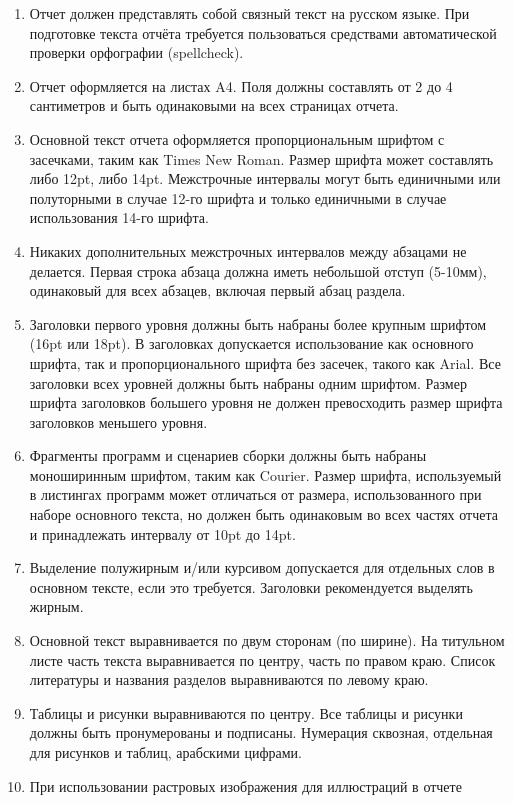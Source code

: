\documentclass[a4paper,12pt,titlepage,final]{article}
\begin{document}
\begin{enumerate}
    \item Отчет должен представлять собой связный текст на русском языке. При
	подготовке текста отчёта требуется пользоваться средствами
	автоматической проверки орфографии (spellcheck).
    \item Отчет оформляется на листах A4. Поля должны составлять от 2 до 4
	сантиметров и быть одинаковыми на всех страницах отчета.
    \item Основной текст отчета оформляется пропорциональным шрифтом с
	засечками, таким как Times New Roman. Размер шрифта может составлять
	либо 12pt, либо 14pt.  Межстрочные интервалы могут быть единичными или
	полуторными в случае 12-го шрифта и только единичными в случае
	использования 14-го шрифта.
    \item Никаких дополнительных межстрочных интервалов между абзацами не
	делается.  Первая строка абзаца должна иметь небольшой отступ (5-10мм),
	одинаковый для всех абзацев, включая первый абзац раздела.
    \item Заголовки первого уровня должны быть набраны более крупным шрифтом
	(16pt или 18pt).  В заголовках допускается использование как основного
	шрифта, так и пропорционального шрифта без засечек, такого как Arial.
	Все заголовки всех уровней должны быть набраны одним шрифтом. Размер
	шрифта заголовков большего уровня не должен превосходить размер шрифта
	заголовков меньшего уровня.
    \item Фрагменты программ и сценариев сборки должны быть набраны моноширинным
	шрифтом, таким как Courier. Размер шрифта, используемый в листингах
	программ может отличаться от размера, использованного при наборе
	основного текста, но должен быть одинаковым во всех частях отчета и
	принадлежать интервалу от 10pt до 14pt.
    \item Выделение полужирным и/или курсивом допускается для отдельных слов в
	основном тексте, если это требуется. Заголовки рекомендуется выделять
	жирным.
    \item Основной текст выравнивается по двум сторонам (по ширине). На
	титульном листе часть текста выравнивается по центру, часть по правом
	краю. Список литературы и названия разделов выравниваются по левому
	краю.
    \item Таблицы и рисунки выравниваются по центру. Все таблицы и рисунки
	должны быть пронумерованы и подписаны. Нумерация сквозная, отдельная для
	рисунков и таблиц, арабскими цифрами.
    \item При использовании растровых изображения для иллюстраций в отчете

\end{enumerate}
\end{document}
